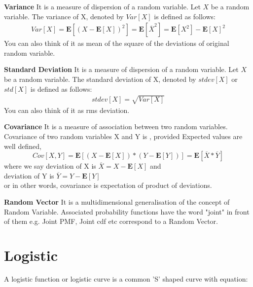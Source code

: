 \documentclass[10pt,a4paper]{article}
\begin{document}
	\begin{defn}{\textbf{Variance}}
		It is a measure of dispersion of a random variable. Let $X$ be a random variable. The variance of X, denoted by $Var[X]$ is defined as follows:\\
		\begin{align}
			Var[X] = \mathbf{E}[(X - \mathbf{E}[X])^2] = \mathbf{E}[\overline{X}^2]
			 = \mathbf{E}[X^2] - \mathbf{E}[X]^2
		\end{align}
		You can also think of it as mean of the square of the deviations of original random variable.
	\end{defn}

	\begin{defn}{\textbf{Standard Deviation}}
	It is a measure of dispersion of a random variable. Let $X$ be a random variable. The standard deviation of X, denoted by $stdev[X]$ or $std[X]$ is defined as follows:\\
	\begin{align}
	stdev[X] = \sqrt{Var[X]}
	\end{align}
	You can also think of it as rms deviation.
	\end{defn}


	\begin{defn}{\textbf{Covariance}}
	It is a measure of association between two random variables.
	Covariance of two random variables X and Y is , provided Expected values are well defined,
	\begin{equation}
		Cov[X,Y] = \mathbf{E}[ (X - \mathbf{E}[X]) * (Y - \mathbf{E}[Y]) ] = \mathbf{E}[\overline{X} * \overline{Y}]
	\end{equation}
	where we say deviation of X is $\overline{X} = X - \mathbf{E}[X]$ and \\
	deviation of Y is $\overline{Y} = Y - \mathbf{E}[Y]$\\
	or in other words, covariance is expectation of product of deviations.
	\end{defn}

	\begin{defn}{\textbf{Random Vector}}
	It is a multidimensional generalisation of the concept of Random Variable. Associated probability functions have the word "joint" in front of them e.g. Joint PMF, Joint cdf etc correspond to a Random Vector.
	\end{defn}

	\section{Logistic}	
	A logistic function or logistic curve is a common 'S' shaped curve with equation:
	
\end{document}
